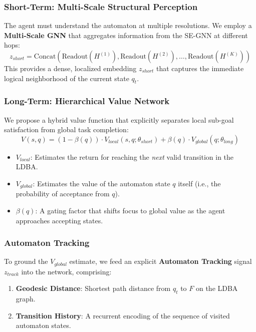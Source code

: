 \documentclass{article}
\begin{document}
\subsubsection{Short-Term: Multi-Scale Structural Perception}
The agent must understand the automaton at multiple resolutions. We employ a \textbf{Multi-Scale GNN} that aggregates information from the SE-GNN at different hops:
\begin{equation}
z_{short} = \text{Concat}(\text{Readout}(H^{(1)}), \text{Readout}(H^{(2)}), \dots, \text{Readout}(H^{(K)}))
\end{equation}
This provides a dense, localized embedding $z_{short}$ that captures the immediate logical neighborhood of the current state $q_t$.

\subsubsection{Long-Term: Hierarchical Value Network}
We propose a hybrid value function that explicitly separates local sub-goal satisfaction from global task completion:
\begin{equation}
V(s, q) = (1 - \beta(q)) \cdot V_{local}(s, q; \theta_{short}) + \beta(q) \cdot V_{global}(q; \theta_{long})
\end{equation}
\begin{itemize}
    \item $V_{local}$: Estimates the return for reaching the \textit{next} valid transition in the LDBA.
    \item $V_{global}$: Estimates the value of the automaton state $q$ itself (i.e., the probability of acceptance from $q$).
    \item $\beta(q)$: A gating factor that shifts focus to global value as the agent approaches accepting states.
\end{itemize}

\subsubsection{Automaton Tracking}
To ground the $V_{global}$ estimate, we feed an explicit \textbf{Automaton Tracking} signal $z_{track}$ into the network, comprising:
\begin{enumerate}
    \item \textbf{Geodesic Distance}: Shortest path distance from $q_t$ to $F$ on the LDBA graph.
    \item \textbf{Transition History}: A recurrent encoding of the sequence of visited automaton states.
\end{enumerate}
\end{document}
